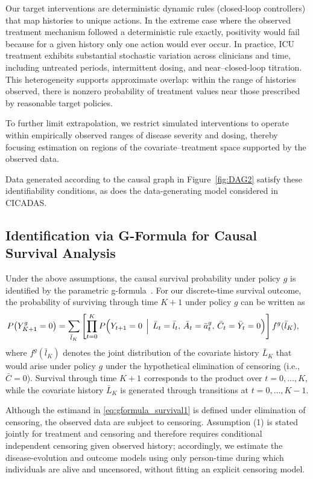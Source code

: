 Our target interventions are deterministic dynamic rules (closed-loop controllers) that
map histories to unique actions. In the extreme case where the observed treatment
mechanism followed a deterministic rule exactly, positivity would fail because for a
given history only one action would ever occur. In practice, ICU treatment exhibits
substantial stochastic variation across clinicians and time, including untreated
periods, intermittent dosing, and near--closed-loop titration. This heterogeneity
supports approximate overlap: within the range of histories observed, there is nonzero
probability of treatment values near those prescribed by reasonable target policies.

To further limit extrapolation, we restrict simulated interventions to operate within
empirically observed ranges of disease severity and dosing, thereby focusing estimation
on regions of the covariate--treatment space supported by the observed data.

Data generated according to the causal graph in Figure~\ref{fig:DAG2} satisfy these
identifiability conditions, as does the data-generating model considered in CICADAS.

\subsection{Identification via G-Formula for Causal Survival Analysis}

Under the above assumptions, the causal survival probability under policy $g$ is
identified by the parametric g-formula~\cite{robins1986new}. For our discrete-time survival outcome, the
probability of surviving through time $K+1$ under policy $g$ can be written as
\begin{align}
\label{eq:gformula_survival1}
P\bigl(Y^g_{K+1} = 0\bigr)
&= \sum_{\bar{l}_K}
\left[
\prod_{t=0}^{K}
P\Bigl(
Y_{t+1} = 0
\,\Bigm|\,
\bar{L}_t = \bar{l}_t,\,
\bar{A}_t = \bar{a}^g_t,\,
\bar{C}_t = \bar{Y}_t = 0
\Bigr)
\right]
f^g(\bar{l}_K),
\end{align}
where $f^g(\bar l_K)$ denotes the joint distribution of the covariate history $\bar L_K$
that would arise under policy $g$ under the hypothetical elimination of censoring (i.e.,
$\bar C=0$). Survival through time $K+1$ corresponds to the product over $t=0,\ldots,K$,
while the covariate history $\bar L_K$ is generated through transitions at
$t=0,\ldots,K-1$.

Although the estimand in \eqref{eq:gformula_survival1} is defined under elimination of
censoring, the observed data are subject to censoring. Assumption (1) is stated jointly
for treatment and censoring and therefore requires conditional independent censoring
given observed history; accordingly, we estimate the disease-evolution and outcome
models using only person-time during which individuals are alive and uncensored, without
fitting an explicit censoring model.

